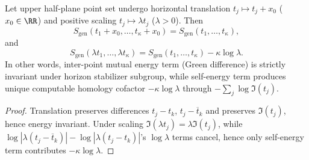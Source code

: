 \begin{corollary}\label{cor:xi-pick-poisson-energy-stabilizer-covariance}
Let upper half-plane point set undergo horizontal translation \(t_j\mapsto t_j+x_0\) (\(x_0\in\RR\)) and positive scaling \(t_j\mapsto \lambda t_j\) (\(\lambda>0\)).
Then
\[
\boxed{\;
S_{\mathrm{gen}}(t_1+x_0,\dots,t_\kappa+x_0)=S_{\mathrm{gen}}(t_1,\dots,t_\kappa),\;}
\]
and
\[
\boxed{\;
S_{\mathrm{gen}}(\lambda t_1,\dots,\lambda t_\kappa)=S_{\mathrm{gen}}(t_1,\dots,t_\kappa)-\kappa\log\lambda.\;}
\]
In other words, inter-point mutual energy term (Green difference) is strictly invariant under horizon stabilizer subgroup, while self-energy term produces unique computable homology cofactor \(-\kappa\log\lambda\) through \(-\sum_j\log\Im(t_j)\).
\end{corollary}
\begin{proof}
Translation preserves differences \(t_j-t_k\), \(t_j-\overline t_k\) and preserves \(\Im(t_j)\), hence energy invariant.
Under scaling \(\Im(\lambda t_j)=\lambda\Im(t_j)\), while \(\log|\lambda(t_j-\overline t_k)|-\log|\lambda(t_j-t_k)|\)'s \(\log\lambda\) terms cancel, hence only self-energy term contributes \(-\kappa\log\lambda\).
\end{proof}

